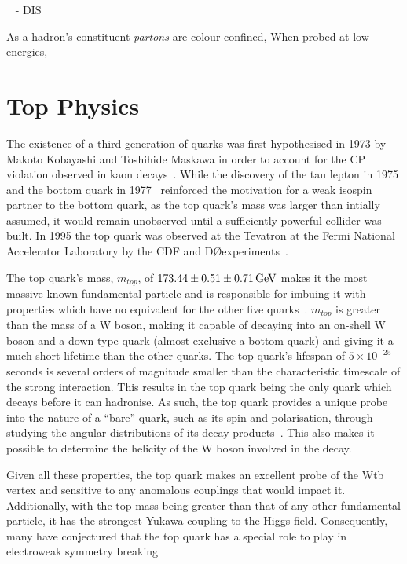 ~\cite{evenish2004deep} - DIS

As a hadron's constituent \emph{partons} are colour confined, 
When probed at low energies, 

\section{Top Physics}\label{sec:top-physics}
The existence of a third generation of quarks was first hypothesised in 1973 by Makoto Kobayashi and Toshihide Maskawa in order to account for the CP violation observed in kaon decays~\cite{Kobayashi:1973fv}.
While the discovery of the tau lepton in 1975 and the bottom quark in 1977~\cite{Herb:1977ek} reinforced the motivation for a weak isospin partner to the bottom quark, as the top quark's mass was larger than intially assumed, it would remain unobserved until a sufficiently powerful collider was built.
In 1995 the top quark was observed at the Tevatron at the Fermi National Accelerator Laboratory by the CDF and D\O experiments~\cite{Abe:1995hr,D0:1995jca}.

The top quark's mass, $m_{top}$, of $173.44 \pm 0.51 \pm 0.71 \,\text{Ge\hspace{-.08em}V}$ makes it the most massive known fundamental particle and is responsible for imbuing it with properties which have no equivalent for the other five quarks~\cite{Patrignani:2016xqp}.
$m_{top}$ is greater than the mass of a W boson, making it capable of decaying into an on-shell W boson and a down-type quark (almost exclusive a bottom quark) and giving it a much short lifetime than the other quarks.
The top quark's lifespan of $5 \times 10^{-25}$ seconds is several orders of magnitude smaller than the characteristic timescale of the strong interaction.
This results in the top quark being the only quark which decays before it can hadronise. 
As such, the top quark provides a unique probe into the nature of a ``bare'' quark, such as its spin and polarisation, through studying the angular distributions of its decay products~\cite{Khachatryan:2015dzz}.
This also makes it possible to determine the helicity of the W boson involved in the decay.

Given all these properties, the top quark makes an excellent probe of the Wtb vertex and sensitive to any anomalous couplings that would impact it.
Additionally, with the top mass being greater than that of any other fundamental particle, it has the strongest Yukawa coupling to the Higgs field.
Consequently, many have conjectured that the top quark has a special role to play in electroweak symmetry breaking~\cite{Giammanco:2017xyn}
 
